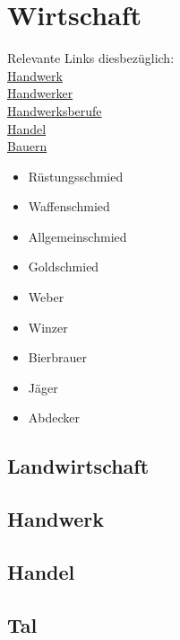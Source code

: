 \chapter{Wirtschaft}
Relevante Links diesbezüglich: \\
\href{https://www.leben-im-mittelalter.net/kultur-im-mittelalter/wirtschaft/handwerk.html}{Handwerk} \\
\href{https://www.leben-im-mittelalter.net/alltag-im-mittelalter/arbeit-und-berufe/handwerker.html}{Handwerker} \\
\href{https://www.leben-im-mittelalter.net/alltag-im-mittelalter/arbeit-und-berufe/handwerker/handwerksberufe.html}{Handwerksberufe} \\
\href{https://www.leben-im-mittelalter.net/kultur-im-mittelalter/wirtschaft/handel.html}{Handel}\\
\href{https://www.leben-im-mittelalter.net/alltag-im-mittelalter/arbeit-und-berufe/bauern.html}{Bauern}\\


\begin{itemize}
	\item Rüstungsschmied
	\item Waffenschmied
	\item Allgemeinschmied
	\item Goldschmied
	\item Weber
	\item Winzer
	\item Bierbrauer
	\item Jäger
	\item Abdecker
\end{itemize}

\section{Landwirtschaft}


\section{Handwerk}

\section{Handel}

\section{Tal}
